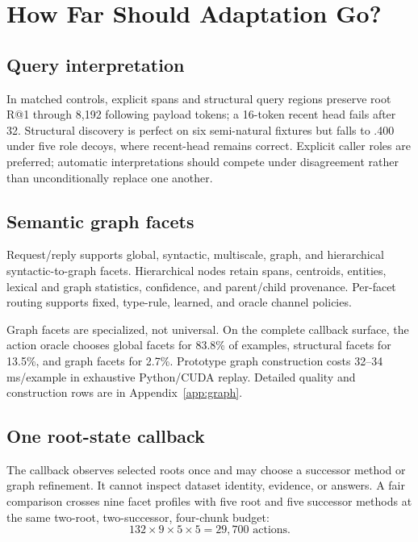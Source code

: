 \documentclass[11pt]{article}
\begin{document}
\section{How Far Should Adaptation Go?}

\subsection{Query interpretation}

In matched controls, explicit spans and structural query regions preserve root R@1 through 8,192
following payload tokens; a 16-token recent head fails after 32. Structural discovery is perfect on
six semi-natural fixtures but falls to .400 under five role decoys, where recent-head remains
correct. Explicit caller roles are preferred; automatic interpretations should compete under
disagreement rather than unconditionally replace one another.

\subsection{Semantic graph facets}

Request/reply supports global, syntactic, multiscale, graph, and hierarchical syntactic-to-graph
facets. Hierarchical nodes retain spans, centroids, entities, lexical and graph statistics,
confidence, and parent/child provenance. Per-facet routing supports fixed, type-rule, learned, and
oracle channel policies.

Graph facets are specialized, not universal. On the complete callback surface, the action oracle
chooses global facets for 83.8\% of examples, structural facets for 13.5\%, and graph facets for
2.7\%. Prototype graph construction costs 32--34 ms/example in exhaustive Python/CUDA replay.
Detailed quality and construction rows are in Appendix~\ref{app:graph}.

\subsection{One root-state callback}

The callback observes selected roots once and may choose a successor method or graph refinement.
It cannot inspect dataset identity, evidence, or answers. A fair comparison crosses nine facet
profiles with five root and five successor methods at the same two-root, two-successor, four-chunk
budget:
\[
132\times9\times5\times5=29{,}700\text{ actions}.
\]
\end{document}
